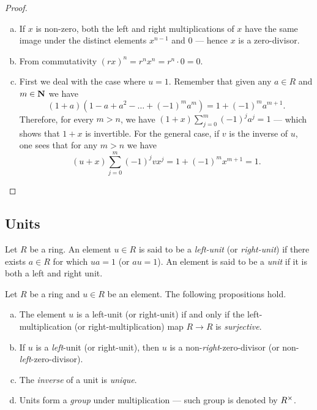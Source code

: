 %
\begin{proof}
    \begin{enumerate}[(a)]\setlength\itemsep{0em}
        \item If \(x\) is non-zero, both the left and right multiplications of \(x\)
              have the same image under the distinct elements \(x^{n-1}\) and \(0\) ---
              hence \(x\) is a zero-divisor.

        \item From commutativity \((r x)^n = r^n x^n = r^n \cdot 0 = 0\).

        \item First we deal with the case where \(u = 1\). Remember that given any
              \(a \in R\) and \(m \in \mathbf{N}\) we have
              \[
                  (1 + a) (1 - a + a^2 - \dots + (-1)^m a^m) = 1 + (-1)^m a^{m + 1}.
              \]
              Therefore, for every \(m > n\), we have
              \((1 + x) \sum_{j=0}^{m} (-1)^j a^j = 1\) --- which shows that \(1 + x\) is
              invertible. For the general case, if \(v\) is the inverse of \(u\), one sees
              that for any \(m > n\) we have
              \[
                  (u + x) \sum_{j=0}^m (-1)^j v x^j = 1 + (-1)^m x^{m + 1} = 1.
              \]
    \end{enumerate}
\end{proof}
%

\subsection{Units}

%
\begin{definition}[Unit]
    \label{def:unit-element-ring}
    Let \(R\) be a ring. An element \(u \in R\) is said to be a \emph{left-unit} (or
    \emph{right-unit}) if there exists \(a \in R\) for which \(u a = 1\) (or
    \(a u = 1\)). An element is said to be a \emph{unit} if it is both a left and
    right unit.
\end{definition}
%

%
\begin{proposition}
    \label{prop:unit-properties-ring}
    Let \(R\) be a ring and \(u \in R\) be an element. The following propositions
    hold.
    \begin{enumerate}[(a)]\setlength\itemsep{0em}
        \item The element \(u\) is a left-unit (or right-unit) if and only if the
              left-multiplication (or right-multiplication) map \(R \to R\) is
              \emph{surjective}.

        \item If \(u\) is a \emph{left}-unit (or right-unit), then \(u\) is a
              non-\emph{right}-zero-divisor (or non-\emph{left}-zero-divisor).

        \item The \emph{inverse} of a unit is \emph{unique}.

        \item Units form a \emph{group} under multiplication --- such group is denoted
              by \(R^{\times}\).
    \end{enumerate}
\end{proposition}
%


